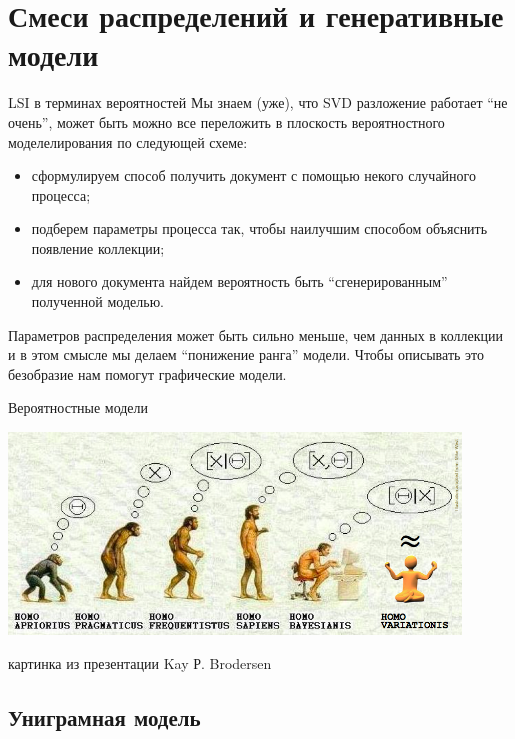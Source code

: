 \documentclass[14pt, fleqn, xcolor={dvipsnames, table}]{beamer}
\begin{document}
\section{Смеси распределений и генеративные модели}

\begin{frame}{LSI в терминах вероятностей}
\small
Мы знаем (уже), что SVD разложение работает ``не очень'', может быть можно все переложить в плоскость вероятностного моделелирования по следующей схеме:
\begin{itemize}
  \item сформулируем способ получить документ с помощью некого случайного процесса;
  \item подберем параметры процесса так, чтобы наилучшим способом объяснить появление коллекции;
  \item для нового документа найдем вероятность быть ``сгенерированным'' полученной моделью.
\end{itemize}
Параметров распределения может быть сильно меньше, чем данных в коллекции и в этом смысле мы делаем ``понижение ранга'' модели. Чтобы описывать это безобразие нам помогут графические модели.
\end{frame}

\begin{frame}{Вероятностные модели}
\begin{center}
\includegraphics[width=0.9\textwidth]{levels.png}
\end{center}
\footnotesize{картинка из презентации Kay Р. Brodersen}
\end{frame}


\subsection{Униграмная модель}
\end{document}
